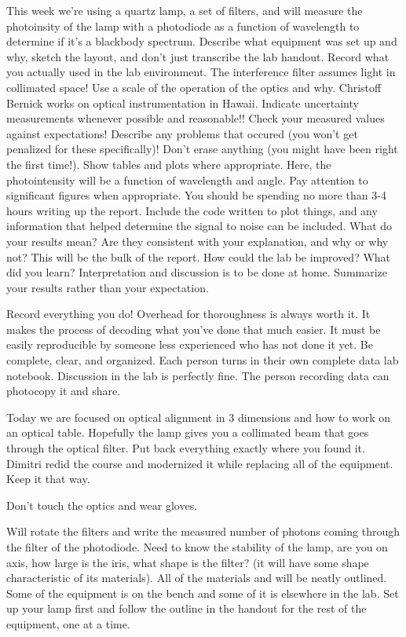 \documentclass[11pt]{article}
\begin{document}
This week we're using a quartz lamp, a set of filters, and will measure
the photoinsity of the lamp with a photodiode as a function of
wavelength to determine if it's a blackbody spectrum. Describe what
equipment was set up and why, sketch the layout, and don't just
transcribe the lab handout. Record what you actually used in the lab
environment. The interference filter assumes light in collimated space!
Use a scale of the operation of the optics and why. Christoff Bernick
works on optical instrumentation in Hawaii. Indicate uncertainty
measurements whenever possible and reasonable!! Check your measured
values against expectations! Describe any problems that occured (you
won't get penalized for these specifically)! Don't erase anything (you
might have been right the first time!). Show tables and plots where
appropriate. Here, the photointensity will be a function of wavelength
and angle. Pay attention to significant figures when appropriate. You
should be spending no more than 3-4 hours writing up the report. Include
the code written to plot things, and any information that helped
determine the signal to noise can be included. What do your results
mean? Are they consistent with your explanation, and why or why not?
This will be the bulk of the report. How could the lab be improved? What
did you learn? Interpretation and discussion is to be done at home.
Summarize your results rather than your expectation.

Record everything you do! Overhead for thoroughness is always worth it.
It makes the process of decoding what you've done that much easier. It
must be easily reproducible by someone less experienced who has not done
it yet. Be complete, clear, and organized. Each person turns in their
own complete data lab notebook. Discussion in the lab is perfectly fine.
The person recording data can photocopy it and share.

Today we are focused on optical alignment in 3 dimensions and how to
work on an optical table. Hopefully the lamp gives you a collimated beam
that goes through the optical filter. Put back everything exactly where
you found it. Dimitri redid the course and modernized it while replacing
all of the equipment. Keep it that way.

Don't touch the optics and wear gloves.

Will rotate the filters and write the measured number of photons coming
through the filter of the photodiode. Need to know the stability of the
lamp, are you on axis, how large is the iris, what shape is the filter?
(it will have some shape characteristic of its materials). All of the
materials and will be neatly outlined. Some of the equipment is on the
bench and some of it is elsewhere in the lab. Set up your lamp first and
follow the outline in the handout for the rest of the equipment, one at
a time.
\end{document}
